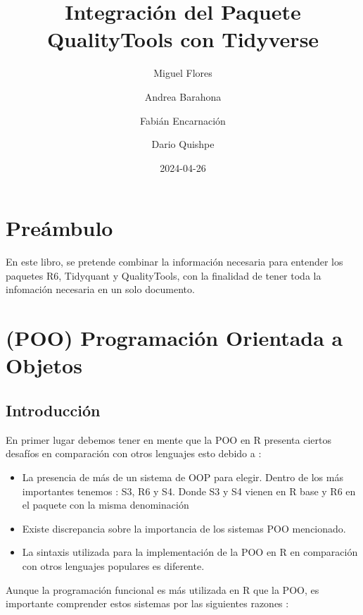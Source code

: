 \documentclass[
]{book}
\title{Integración del Paquete QualityTools con Tidyverse}
\author{Miguel Flores \and Andrea Barahona \and Fabián Encarnación \and Dario Quishpe}
\date{2024-04-26}
\begin{document}
\maketitle

{
\setcounter{tocdepth}{1}
\tableofcontents
}
\hypertarget{preuxe1mbulo}{%
\chapter{Preámbulo}\label{preuxe1mbulo}}

En este libro, se pretende combinar la información necesaria para entender los paquetes R6, Tidyquant y QualityTools, con la finalidad de tener toda la infomación necesaria en un solo documento.

\hypertarget{poo-programaciuxf3n-orientada-a-objetos}{%
\chapter{(POO) Programación Orientada a Objetos}\label{poo-programaciuxf3n-orientada-a-objetos}}

\hypertarget{introducciuxf3n}{%
\section{Introducción}\label{introducciuxf3n}}

En primer lugar debemos tener en mente que la POO en R presenta ciertos desafíos en comparación con otros lenguajes esto debido a :

\begin{itemize}
\item
  La presencia de más de un sistema de OOP para elegir. Dentro de los más importantes tenemos : S3, R6 y S4. Donde S3 y S4 vienen en R base y R6 en el paquete con la misma denominación
\item
  Existe discrepancia sobre la importancia de los sistemas POO mencionado.
\item
  La sintaxis utilizada para la implementación de la POO en R en comparación con otros lenguajes populares es diferente.
\end{itemize}

Aunque la programación funcional es más utilizada en R que la POO, es importante comprender estos sistemas por las siguientes razones :
\end{document}
